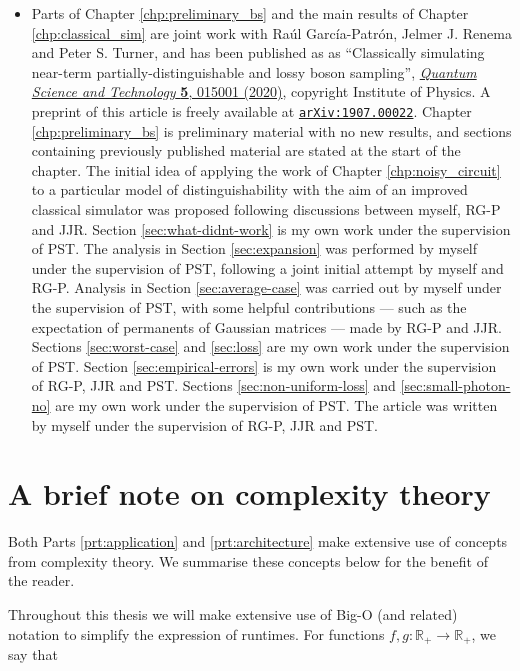 \begin{itemize}
\item Parts of Chapter \ref{chp:preliminary_bs} and the main results of Chapter \ref{chp:classical_sim} are joint work with Ra\'{u}l Garc\'{i}a-Patr\'{o}n, Jelmer J. Renema and Peter S. Turner, and has been published as as ``Classically simulating near-term partially-distinguishable and lossy boson sampling'', \href{https://iopscience.iop.org/article/10.1088/2058-9565/ab5555}{\textit{Quantum Science and Technology} \textbf{5}, 015001 (2020)}, copyright Institute of Physics. A preprint of this article is freely available at {\tt \href{https://arxiv.org/abs/1907.00022}{arXiv:1907.00022}}. Chapter \ref{chp:preliminary_bs} is preliminary material with no new results, and sections containing previously published material are stated at the start of the chapter. The initial idea of applying the work of Chapter \ref{chp:noisy_circuit} to a particular model of distinguishability with the aim of an improved classical simulator was proposed following discussions between myself, RG-P and JJR. Section \ref{sec:what-didnt-work} is my own work under the supervision of PST. The analysis in Section \ref{sec:expansion} was performed by myself under the supervision of PST, following a joint initial attempt by myself and RG-P. Analysis in Section \ref{sec:average-case} was carried out by myself under the supervision of PST, with some helpful contributions --- such as the expectation of permanents of Gaussian matrices --- made by RG-P and JJR. Sections \ref{sec:worst-case} and \ref{sec:loss} are my own work under the supervision of PST. Section \ref{sec:empirical-errors} is my own work under the supervision of RG-P, JJR and PST. Sections \ref{sec:non-uniform-loss} and \ref{sec:small-photon-no} are my own work under the supervision of PST. The article was written by myself under the supervision of RG-P, JJR and PST.
\end{itemize}

\section{A brief note on complexity theory}
\label{sec:notation}

Both Parts \ref{prt:application} and \ref{prt:architecture} make extensive use of concepts from complexity theory. We summarise these concepts below for the benefit of the reader.

Throughout this thesis we will make extensive use of Big-O (and related) notation to simplify the expression of runtimes. For functions $f, g\colon \mathbb{R}_+\rightarrow \mathbb{R}_+$, we say that


